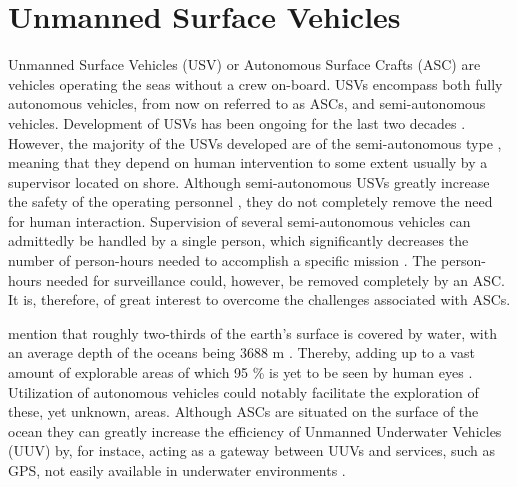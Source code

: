 \chapter{Unmanned Surface Vehicles} %

\label{Unmanned_Surface_Vehicles} %

Unmanned Surface Vehicles (USV) or Autonomous Surface Crafts (ASC) are vehicles operating the seas without a crew on-board.
USVs encompass both fully autonomous vehicles, from now on referred to as ASCs, and semi-autonomous vehicles.
Development of USVs has been ongoing for the last two decades \cite{manley2008unmanned}.
However, the majority of the USVs developed are of the semi-autonomous type \cite{liu2016unmanned,park2017development}, meaning that they depend on human intervention to some extent usually by a supervisor located on shore.
Although semi-autonomous USVs greatly increase the safety of the operating personnel \cite{liu2016unmanned}, they do not completely remove the need for human interaction.
Supervision of several semi-autonomous vehicles can admittedly be handled by a single person, which significantly decreases the number of person-hours needed to accomplish a specific mission \cite{manley2008unmanned}.
The person-hours needed for surveillance could, however, be removed completely by an ASC.
It is, therefore, of great interest to overcome the challenges associated with ASCs.


\textcite{Yuh2011} mention that roughly two-thirds of the earth's surface is covered by water, with an average depth of the oceans being 3688 m \cite{depth_ocean}.
Thereby, adding up to a vast amount of explorable areas of which 95 \% is yet to be seen by human eyes \cite{explored_percentage}. Utilization of autonomous vehicles could notably facilitate the  exploration of these, yet unknown, areas.
Although ASCs are situated on the surface of the ocean they can greatly increase the efficiency of Unmanned Underwater Vehicles (UUV) by, for instace, acting as a gateway between UUVs and services, such as GPS, not easily available in underwater environments \cite{liu2016unmanned}.

